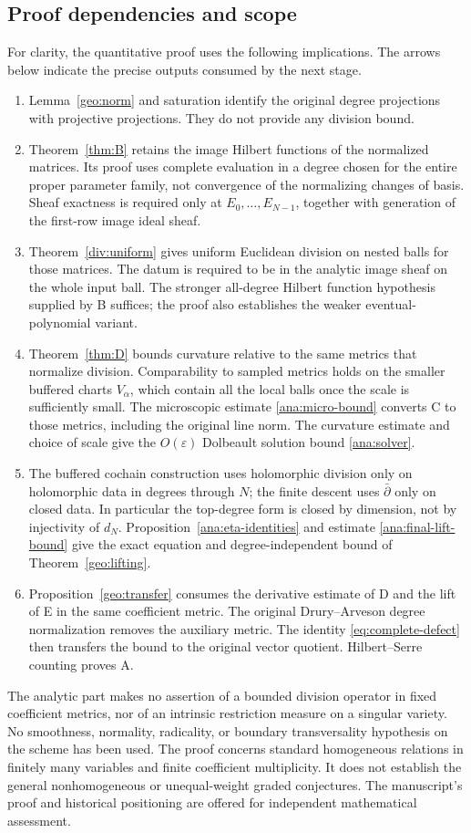 \documentclass[11pt,reqno]{amsart}
\numberwithin{equation}{section}
\theoremstyle{definition}
\theoremstyle{remark}
\begin{document}
\subsection{Proof dependencies and scope}
For clarity, the quantitative proof uses the following implications. The
arrows below indicate the precise outputs consumed by the next stage.
\begin{enumerate}
\item Lemma~\ref{geo:norm} and saturation identify the original degree
projections with projective projections. They do not provide any division
bound.
\item Theorem~\ref{thm:B} retains the image Hilbert functions of the
normalized matrices. Its proof uses complete evaluation in a degree
chosen for the entire proper parameter family, not convergence of the
normalizing changes of basis. Sheaf exactness is required only at
$E_0,\ldots,E_{N-1}$, together with generation of the first-row image
ideal sheaf.
\item Theorem~\ref{div:uniform} gives uniform Euclidean division on nested
balls for those matrices. The datum is required to be in the analytic
image sheaf on the whole input ball. The stronger all-degree Hilbert
function hypothesis supplied by B suffices; the proof also establishes
the weaker eventual-polynomial variant.
\item Theorem~\ref{thm:D} bounds curvature relative to the same metrics
that normalize division. Comparability to sampled metrics holds on
the smaller buffered charts $V_\alpha$, which contain all the local
balls once the scale is sufficiently small. The microscopic estimate
\eqref{ana:micro-bound} converts C to those metrics, including the original
line norm. The curvature estimate and choice of scale give the
$O(\varepsilon)$ Dolbeault solution bound \eqref{ana:solver}.
\item The buffered cochain construction uses holomorphic division only
on holomorphic data in degrees through $N$; the finite descent uses
$\bar\partial$ only on closed data. In particular the top-degree form
is closed by dimension, not by injectivity of $d_N$.
Proposition~\ref{ana:eta-identities} and estimate
\eqref{ana:final-lift-bound} give the exact equation and degree-independent
bound of Theorem~\ref{geo:lifting}.
\item Proposition~\ref{geo:transfer} consumes the derivative estimate of D
and the lift of E in the same coefficient metric. The original
Drury--Arveson degree normalization removes the auxiliary metric.
The identity \eqref{eq:complete-defect} then transfers the bound to the
original vector quotient. Hilbert--Serre counting proves A.
\end{enumerate}
The analytic part makes no assertion of a bounded division operator in
fixed coefficient metrics, nor of an intrinsic restriction measure on a
singular variety. No smoothness, normality, radicality, or boundary
transversality hypothesis on the scheme has been used. The proof concerns
standard homogeneous relations in finitely many variables and finite
coefficient multiplicity. It does not establish the general
nonhomogeneous or unequal-weight graded conjectures. The manuscript's
proof and historical positioning are offered for independent mathematical
assessment.
\end{document}
